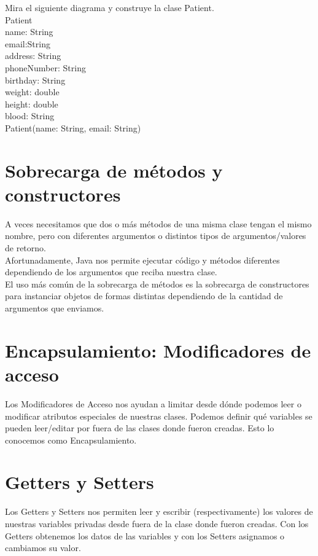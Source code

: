 \documentclass{article}
\begin{document}
Mira el siguiente diagrama y construye la clase Patient.\\

Patient\\
name: String\\
email:String\\
address: String\\
phoneNumber: String\\
birthday: String\\
weight: double\\
height: double\\
blood: String\\
Patient(name: String, email: String)\\


\section{Sobrecarga de métodos y constructores}%
A veces necesitamos que dos o más métodos de una misma clase tengan el mismo
nombre, pero con diferentes argumentos o distintos tipos de argumentos/valores
de retorno.\\

Afortunadamente, Java nos permite ejecutar código y métodos diferentes
dependiendo de los argumentos que reciba nuestra clase.\\

El uso más común de la sobrecarga de métodos es la sobrecarga de constructores
para instanciar objetos de formas distintas dependiendo de la cantidad de
argumentos que enviamos.\\


\section{Encapsulamiento: Modificadores de acceso}%
Los Modificadores de Acceso nos ayudan a limitar desde dónde podemos leer o
modificar atributos especiales de nuestras clases. Podemos definir qué
variables se pueden leer/editar por fuera de las clases donde fueron creadas.
Esto lo conocemos como Encapsulamiento.\\


\section{Getters y Setters}%
Los Getters y Setters nos permiten leer y escribir (respectivamente) los
valores de nuestras variables privadas desde fuera de la clase donde fueron
creadas. Con los Getters obtenemos los datos de las variables y con los Setters
asignamos o cambiamos su valor.\\
\end{document}
